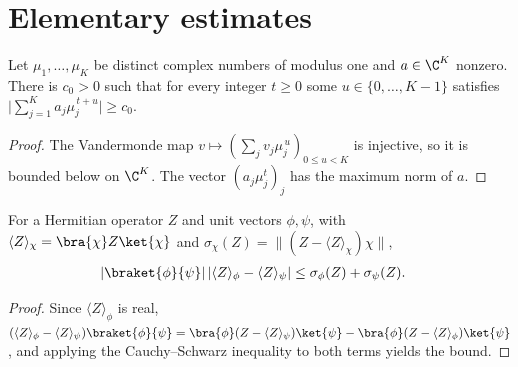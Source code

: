 \section{Elementary estimates}
\label{sec:perturbations_estimates}

\begin{lemma}
    \label{lem:ldp_vandermonde_window}
    \leanok
    Let $\mu_1,\dots,\mu_K$ be distinct complex numbers of modulus one and
    $a\in\C^K$ nonzero. There is $c_0>0$ such that for every integer $t\ge0$
    some $u\in\{0,\dots,K-1\}$ satisfies
    $\bigl\lvert\sum_{j=1}^Ka_j\mu_j^{\,t+u}\bigr\rvert\ge c_0$.
\end{lemma}
\begin{proof}
    \leanok
    The Vandermonde map $v\mapsto(\sum_jv_j\mu_j^{\,u})_{0\le u<K}$ is
    injective, so it is bounded below on $\C^K$. The vector
    $(a_j\mu_j^t)_j$ has the maximum norm of $a$.
\end{proof}

\begin{lemma}
    \label{lem:ldp_expectation_overlap}
    \leanok
    For a Hermitian operator $Z$ and unit vectors $\phi,\psi$, with
    $\langle Z\rangle_\chi=\bra{\chi}Z\ket{\chi}$ and
    $\sigma_\chi(Z)=\lVert(Z-\langle Z\rangle_\chi)\chi\rVert$,
    \begin{align}
        \lvert\braket{\phi}{\psi}\rvert\,
        \lvert\langle Z\rangle_\phi-\langle Z\rangle_\psi\rvert
         & \le\sigma_\phi(Z)+\sigma_\psi(Z).
        \label{eq:ldp_expectation_overlap}
    \end{align}
\end{lemma}
\begin{proof}
    \leanok
    Since $\langle Z\rangle_\phi$ is real,
    $(\langle Z\rangle_\phi-\langle Z\rangle_\psi)\braket{\phi}{\psi}
        =\bra{\phi}(Z-\langle Z\rangle_\psi)\ket{\psi}
        -\bra{\phi}(Z-\langle Z\rangle_\phi)\ket{\psi}$, and applying the
    Cauchy--Schwarz inequality to both terms yields the bound.
\end{proof}

